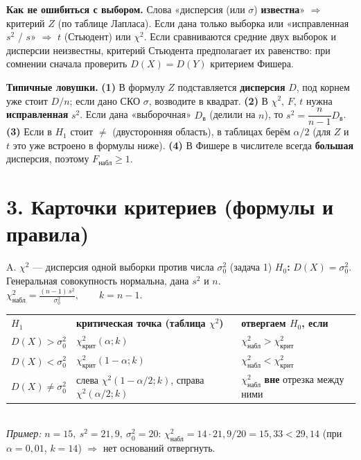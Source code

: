 \documentclass[a4paper,10pt]{extarticle}
\newcommand{\kr}{\text{крит}}\newcommand{\nab}{\text{набл}}
\begin{document}
\begin{warn}\small
\textbf{Как не ошибиться с выбором.} Слова «дисперсия (или $\sigma$) \textbf{известна}» $\Rightarrow$ критерий $Z$ (по таблице Лапласа). Если дана только выборка или «исправленная $s^2$ / $s$» $\Rightarrow$ $t$ (Стьюдент) или $\chi^2$. Если сравниваются средние двух выборок и дисперсии неизвестны, критерий Стьюдента предполагает их равенство: при сомнении сначала проверить $D(X)=D(Y)$ критерием Фишера.
\end{warn}

\begin{warn}\small
\textbf{Типичные ловушки.}
\textbf{(1)} В формулу $Z$ подставляется \textbf{дисперсия} $D$, под корнем уже стоит $D/n$; если дано СКО $\sigma$, возводите в квадрат. \;
\textbf{(2)} В $\chi^2$, $F$, $t$ нужна \textbf{исправленная} $s^2$. Если дана «выборочная» $D_{\text{в}}$ (делили на $n$), то $s^2=\dfrac{n}{n-1}D_{\text{в}}$. \;
\textbf{(3)} Если в $H_1$ стоит $\ne$ (двусторонняя область), в таблицах берём \textbf{$\alpha/2$} (для $Z$ и $t$ это уже встроено в формулы ниже). \;
\textbf{(4)} В Фишере в числителе всегда \textbf{большая} дисперсия, поэтому $F_{\nab}\ge 1$.
\end{warn}

\newpage
\section*{3. Карточки критериев (формулы и правила)}
\renewcommand{\arraystretch}{1.15}

\begin{card}{A. $\chi^2$ --- дисперсия одной выборки против числа $\sigma_0^2$ \hfill (задача 1)}
\textbf{$H_0$:} $D(X)=\sigma_0^2$. \quad Генеральная совокупность нормальна, дана $s^2$ и $n$.\\
$\displaystyle \chi^2_{\nab}=\frac{(n-1)\,s^2}{\sigma_0^2},\qquad k=n-1.$\\
\begin{tabular}{@{}p{3.4cm}p{5.6cm}p{7.8cm}@{}}
\textbf{$H_1$} & \textbf{критическая точка (таблица $\chi^2$)} & \textbf{отвергаем $H_0$, если} \\
$D(X)>\sigma_0^2$ & $\chi^2_\kr(\alpha;k)$ & $\chi^2_{\nab}>\chi^2_\kr$ \\
$D(X)<\sigma_0^2$ & $\chi^2_\kr(1-\alpha;k)$ & $\chi^2_{\nab}<\chi^2_\kr$ \\
$D(X)\ne\sigma_0^2$ & слева $\chi^2(1-\alpha/2;k)$, справа $\chi^2(\alpha/2;k)$ & $\chi^2_{\nab}$ \textbf{вне} отрезка между ними \\
\end{tabular}\\
\emph{Пример:} $n=15,\ s^2=21{,}9,\ \sigma_0^2=20$: $\chi^2_{\nab}=14\cdot21{,}9/20=15{,}33<29{,}14$ (при $\alpha=0{,}01$, $k=14$) $\Rightarrow$ нет оснований отвергнуть.
\end{card}
\end{document}
